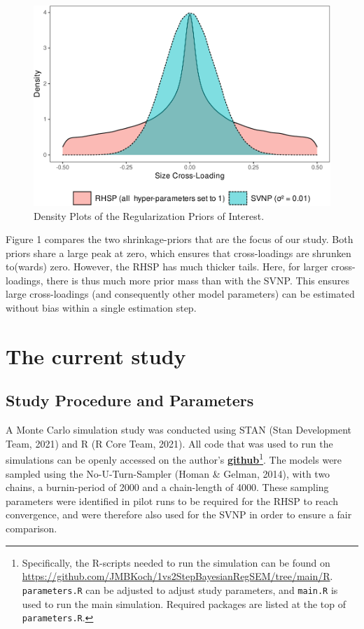 \documentclass[
  man, donotrepeattitle,floatsintext]{apa6}
\begin{document}
\begin{figure}
\centering
\includegraphics{JMBKoch_thesis_files/figure-latex/unnamed-chunk-1-1.pdf}
\caption{\label{fig:unnamed-chunk-1}Density Plots of the Regularization Priors of Interest.}
\end{figure}

Figure 1 compares the two shrinkage-priors that are the focus of our study. Both priors share a large peak at zero, which ensures that cross-loadings are shrunken to(wards) zero. However, the RHSP has much thicker tails. Here, for larger cross-loadings, there is thus much more prior mass than with the SVNP. This ensures large cross-loadings (and consequently other model parameters) can be estimated without bias within a single estimation step.

\hypertarget{the-current-study}{%
\section{The current study}\label{the-current-study}}

\hypertarget{study-procedure-and-parameters}{%
\subsection{Study Procedure and Parameters}\label{study-procedure-and-parameters}}

A Monte Carlo simulation study was conducted using STAN (Stan Development Team, 2021) and R (R Core Team, 2021). All code that was used to run the simulations can be openly accessed on the author's \href{https://github.com/JMBKoch/1vs2StepBayesianRegSEM}{\textbf{github}}\footnote{Specifically, the R-scripts needed to run the simulation can be found on \url{https://github.com/JMBKoch/1vs2StepBayesianRegSEM/tree/main/R}. \texttt{parameters.R} can be adjusted to adjust study parameters, and \texttt{main.R} is used to run the main simulation. Required packages are listed at the top of \texttt{parameters.R}.}. The models were sampled using the No-U-Turn-Sampler (Homan \& Gelman, 2014), with two chains, a burnin-period of 2000 and a chain-length of 4000. These sampling parameters were identified in pilot runs to be required for the RHSP to reach convergence, and were therefore also used for the SVNP in order to ensure a fair comparison.
\end{document}
